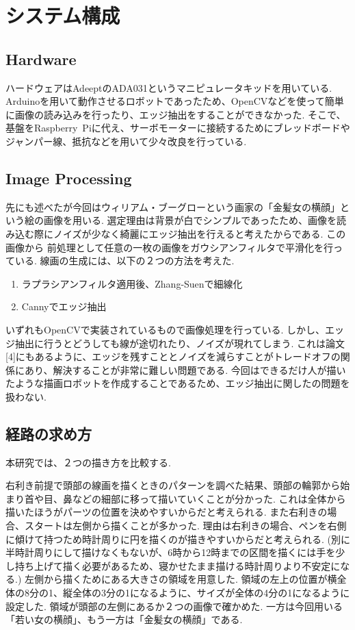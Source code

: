 \documentclass[10pt]{jarticle}
\begin{document}
    
    
    
    \section{システム構成}
	\subsection{Hardware}
	ハードウェアはAdeeptのADA031というマニピュレータキッドを用いている.
	Arduinoを用いて動作させるロボットであったため、OpenCVなどを使って簡単に画像の読み込みを行ったり、エッジ抽出をすることができなかった.
	そこで、基盤をRaspberry\ Piに代え、サーボモーターに接続するためにブレッドボードやジャンパー線、抵抗などを用いて少々改良を行っている.

	\subsection{Image Processing}
	先にも述べたが今回はウィリアム・ブーグローという画家の「金髪女の横顔」という絵の画像を用いる.
	選定理由は背景が白でシンプルであったため、画像を読み込む際にノイズが少なく綺麗にエッジ抽出を行えると考えたからである.
	この画像から
	前処理として任意の一枚の画像をガウシアンフィルタで平滑化を行っている.
	線画の生成には、以下の２つの方法を考えた.
	\begin{enumerate}
		\item ラプラシアンフィルタ適用後、Zhang-Suenで細線化
		\item Cannyでエッジ抽出
	\end{enumerate}
	いずれもOpenCVで実装されているもので画像処理を行っている.
	しかし、エッジ抽出に行うとどうしても線が途切れたり、ノイズが現れてしまう.
	これは論文[4]にもあるように、エッジを残すこととノイズを減らすことがトレードオフの関係にあり、解決することが非常に難しい問題である.
	今回はできるだけ人が描いたような描画ロボットを作成することであるため、エッジ抽出に関したの問題を扱わない.


	
	\subsection{経路の求め方}
	本研究では、２つの描き方を比較する.

	右利き前提で頭部の線画を描くときのパターンを調べた結果、頭部の輪郭から始まり首や目、鼻などの細部に移って描いていくことが分かった.
	これは全体から描いたほうがパーツの位置を決めやすいからだと考えられる.
	また右利きの場合、スタートは左側から描くことが多かった.
	理由は右利きの場合、ペンを右側に傾けて持つため時計周りに円を描くのが描きやすいからだと考えられる.
	(別に半時計周りにして描けなくもないが、6時から12時までの区間を描くには手を少し持ち上げて描く必要があるため、寝かせたまま描ける時計周りより不安定になる.)
	左側から描くためにある大きさの領域を用意した.
	領域の左上の位置が横全体の8分の1、縦全体の3分の1になるように、サイズが全体の4分の1になるように設定した.
	領域が頭部の左側にあるか２つの画像で確かめた.
	一方は今回用いる「若い女の横顔」、もう一方は「金髪女の横顔」である.
\end{document}
